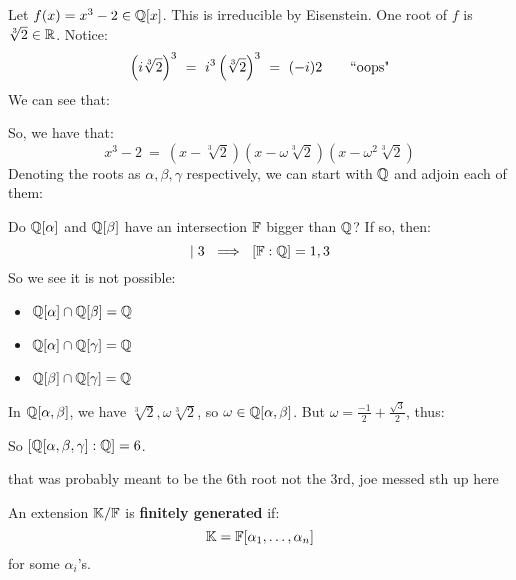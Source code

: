 \begin{xmp}[source=Primary Source Material]
    Let $ f(x) = x^{3}-2 \in \mathbb{Q}[x] $. This is irreducible by Eisenstein.
    One root of $ f $ is $ \sqrt[3]{2} \in \mathbb{R} $. Notice:
    \begin{equation*}
        \left( i\sqrt[3]{2} \right)^{3} \ = \ i^{3}\left( \sqrt[3]{2} \right)^{3}
        \ = \ (-i)2 \qquad \trm{``oops"}
    \end{equation*}
    We can see that:
    
    \centering
    \flushleft
    
    So, we have that:
    \begin{equation*}
        x^{3}-2 \ = \ \left( x-\sqrt[3]{2} \right)\left( x-\omega\sqrt[3]{2}
        \right)\left( x-\omega^{2}\sqrt[3]{2} \right)
    \end{equation*}
    Denoting the roots as $ \alpha, \beta, \gamma $ respectively, we can start
    with $ \mathbb{Q} $ and adjoin each of them:
    
    \centering
    \flushleft
    
    Do $ \mathbb{Q}[\alpha] $ and $ \mathbb{Q}[\beta] $ have an intersection $ \mathbb{F} $
    bigger than $ \mathbb{Q} $? If so, then:
    \begin{equation*}
        [\bb{F}:\bb{Q}] \mid 3 \ \implies \ [\bb{F}:\bb{Q}] = 1, 3
    \end{equation*}
    So we see it is not possible:
    \begin{itemize}
        \item $ \mathbb{Q}[\alpha] \cap \mathbb{Q}[\beta] = \mathbb{Q} $
        \item $ \mathbb{Q}[\alpha] \cap \mathbb{Q}[\gamma] = \mathbb{Q} $
        \item $ \mathbb{Q}[\beta] \cap \mathbb{Q}[\gamma] = \mathbb{Q} $
    \end{itemize}
    In $ \mathbb{Q}[\alpha, \beta] $, we have $ \sqrt[3]{2}, \omega\sqrt[3]{2} $,
    so $ \omega \in \mathbb{Q}[\alpha, \beta] $. But $ \omega = \frac{-1}{2} +
    \frac{\sqrt{3}}{2} $, thus:
    
    \centering
    \flushleft
    
    So $ [\mathbb{Q}[\alpha,\beta,\gamma] : \mathbb{Q}] = 6 $.
\end{xmp}
that was probably meant to be the 6th root not the 3rd, joe messed sth up here

\begin{defn}
    An extension $ \mathbb{K}/\mathbb{F} $ is \textbf{finitely generated} if:
    \begin{equation*}
        \mathbb{K} = \mathbb{F}[\alpha_{1}, \dots, \alpha_{n}]
    \end{equation*}
    for some $ \alpha_{i} $'s.
\end{defn}

